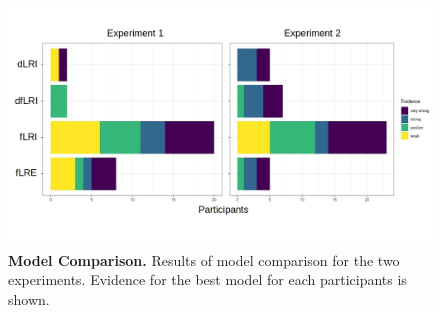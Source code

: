 \documentclass[a4paper,12pt]{article}
\begin{document}
\begin{figure}[ht!]
\centerline
{\includegraphics[width=1\textwidth]{figures/ModelComparisonAll.jpg}}
\caption{\textbf{Model Comparison.} Results of model comparison for the two experiments. Evidence for the best model for each participants is shown.}
\label{fig:ModelComparison}
\end{figure}

\begin{table} 
    \centering 
    \caption{\label{tab:ModelComp}Model Comparison. BIC values and standard errors for each model for Experiment 1 and experiment 2. \textit{Best(N)} and \textit{Very strong(N)} refer to the number of participants for which the model was the best fit and for which there was very strong evidence, respectively.  }
    \end{table}
\end{document}
